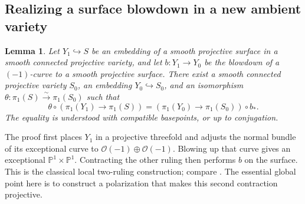 \documentclass[11pt,reqno]{amsart}
\numberwithin{equation}{section}
\newtheorem{lemma}[theorem]{Lemma}
\theoremstyle{definition}
\theoremstyle{remark}
\newcommand{\PP}{\mathbb P}
\begin{document}
\subsection{Realizing a surface blowdown in a new ambient variety}

\begin{lemma}\label{lem:ambient-blowdown}
Let $Y_1\hookrightarrow S$ be an embedding of a smooth projective
surface in a smooth connected projective variety, and let
$b:Y_1\to Y_0$ be the blowdown of a $(-1)$-curve to a smooth projective
surface.  There exist a smooth connected projective variety $S_0$, an
embedding $Y_0\hookrightarrow S_0$, and an isomorphism
$\theta:\pi_1(S)\xrightarrow{\sim}\pi_1(S_0)$ such that
\[
 \theta\circ(\pi_1(Y_1)\to\pi_1(S))
 = (\pi_1(Y_0)\to\pi_1(S_0))\circ b_*.
\]
The equality is understood with compatible basepoints, or up to
conjugation.
\end{lemma}

The proof first places $Y_1$ in a projective threefold and adjusts the
normal bundle of its exceptional curve to
$\mathcal O(-1)\oplus\mathcal O(-1)$.  Blowing up that curve gives an
exceptional $\PP^1\times\PP^1$.  Contracting the other ruling then
performs $b$ on the surface.  This is the classical local two-ruling
construction; compare \cite{Atiyah1958}.  The essential global point
here is to construct a polarization that makes this second contraction
projective.
\end{document}
